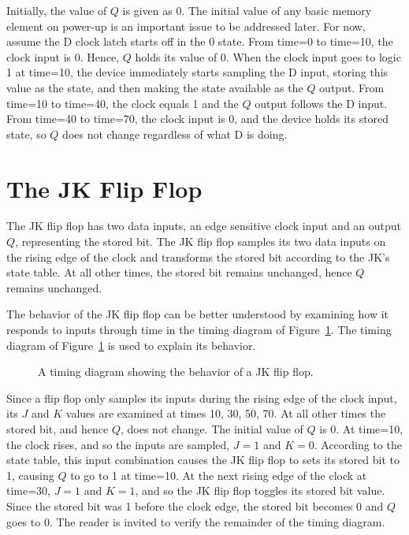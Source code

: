 Initially, the value of $Q$ is given as 0.  The initial value
of any basic memory element on power-up is an important issue
to be addressed later. For now, assume the
D clock latch starts off in the 0 state.  From time=0 to time=10, the
clock input is 0. Hence, $Q$ holds its value of 0.  When the
clock input goes to logic 1 at time=10, the device immediately
starts sampling the D input, storing this value as the state,
and then making the state available as the $Q$ output.  From
time=10 to time=40, the clock equals 1 and the $Q$ output follows
the D input.  From time=40 to time=70, the clock input is 0, and
the device holds its stored state, so $Q$ does not change
regardless of what D is doing.

\section{The JK Flip Flop}
The JK flip flop has two data inputs, an edge sensitive clock
input and an output $Q$, representing the stored bit.  The
JK flip flop samples its two data inputs on the rising edge
of the clock and transforms the stored bit according to the
JK's state table.  At all other times, the stored bit remains
unchanged, hence $Q$ remains unchanged.

The behavior of the JK flip flop can be better understood
by examining how it responds to inputs through time in the
timing diagram of Figure~\ref{fig:sequentialCirJKFF}.
The timing diagram of Figure~\ref{fig:sequentialCirJKFF}
is used to explain its behavior.
\begin{figure}[ht]
\caption{A timing diagram showing the behavior of a JK flip flop.}
\label{fig:sequentialCirJKFF}
\end{figure}

Since a flip flop only samples its inputs during the rising edge
of the clock input, its $J$ and $K$ values are examined
at times 10, 30, 50, 70. At all other times the stored bit, and
hence $Q$, does not change. The initial value of $Q$ is 0.  At
time=10, the clock rises, and so the inputs are sampled, $J=1$ and
$K=0$.  According to the state table, this input combination causes
the JK flip flop to sets its stored bit to 1, causing $Q$ to go
to 1 at time=10.  At the next rising edge of the clock at time=30,
$J=1$ and $K=1$, and so the JK flip flop toggles its stored bit value.
Since the stored bit was 1 before the clock edge, the stored bit
becomes 0 and $Q$ goes to 0.  The reader is invited to verify the
remainder of the timing diagram.

